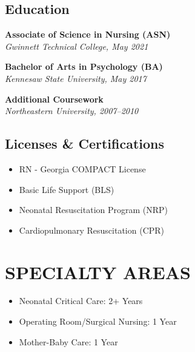 \documentclass[letterpaper, 9.5pt]{article} %
\newcommand{\education}[3]{%
    \textbf{#1} \\
    \textit{#2, #3}
    \vspace{0.2mm} %
}
\begin{document}
\subsection*{\textbf{Education}}
\education{Associate of Science in Nursing (ASN)}{Gwinnett Technical College}{May 2021}
\education{Bachelor of Arts in Psychology (BA)}{Kennesaw State University}{May 2017}
\education{Additional Coursework}{Northeastern University}{2007–2010}


\subsection*{\textbf{Licenses \& Certifications}}
\begin{itemize}[leftmargin=*, itemsep=0pt, parsep=0pt]
    \item RN - Georgia COMPACT License
    \item Basic Life Support (BLS)
    \item Neonatal Resuscitation Program (NRP)
    \item Cardiopulmonary Resuscitation (CPR)
\end{itemize}

\vspace{1mm}

\section{SPECIALTY AREAS}
\begin{itemize}[leftmargin=*, itemsep=0pt, parsep=0pt]
    \item Neonatal Critical Care: 2+ Years
    \item Operating Room/Surgical Nursing: 1 Year
    \item Mother-Baby Care: 1 Year
\end{itemize}
\end{document}
